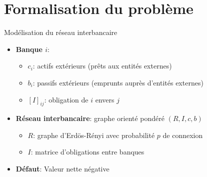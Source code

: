 \documentclass[aspectratio=169]{beamer}
\begin{document}
    \section{Formalisation du problème}\label{sec:formalisation-du-probleme}
    \begin{frame}{Modélisation du réseau interbancaire}
        \begin{itemize}
            \item \textbf{Banque $i$}:
            \begin{itemize}
                \item $c_i$: actifs extérieurs (prêts aux entités externes)
                \item $b_i$: passifs extérieurs (emprunts auprès d'entités externes)
                \item $[I]_{ij}$: obligation de $i$ envers $j$
            \end{itemize}
            \vspace{0.2cm}
            \item \textbf{Réseau interbancaire}: graphe orienté pondéré $(R,I,c,b)$
            \begin{itemize}
                \item $R$: graphe d'Erdös-Rényi avec probabilité $p$ de connexion
                \item $I$: matrice d'obligations entre banques
            \end{itemize}
            \vspace{0.2cm}
            \item \textbf{Défaut}: Valeur nette négative
        \end{itemize}
    \end{frame}
\end{document}
